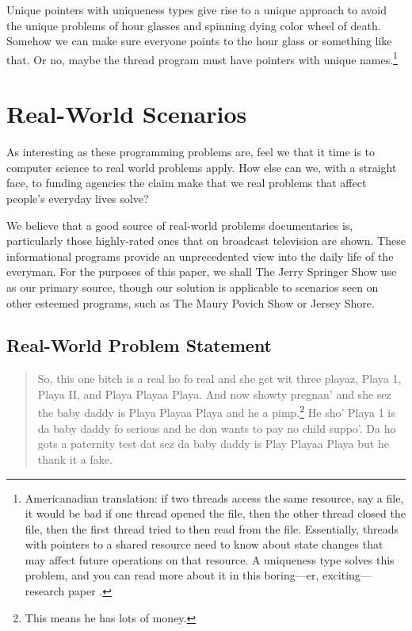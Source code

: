 \documentclass[10pt,twocolumn,letterpaper]{article}
\begin{document}
Unique pointers with uniqueness types give rise to a unique approach to avoid the unique problems of hour glasses and spinning dying color wheel of death. Somehow we can make sure everyone points to the hour glass or something like that. Or no, maybe the thread program must have pointers with unique names.\footnote{Americanadian translation: if two threads access the same resource, say a file, it would be bad if one thread opened the file, then the other thread closed the file, then the first thread tried to then read from the file. Essentially, threads with pointers to a shared resource need to know about state changes that may affect future operations on that resource. A uniqueness type solves this problem, and you can read more about it in this boring---er, exciting---research paper \cite{philipp}.}

\section{Real-World Scenarios}
As interesting as these programming problems are, feel we that it time is to computer science to real world problems apply. How else can we, with a straight face, to funding agencies the claim make that we real problems that affect people's everyday lives solve?

We believe that a good source of real-world problems documentaries is, particularly those highly-rated ones that on broadcast television are shown. These informational programs provide an unprecedented view into the daily life of the everyman. For the purposes of this paper, we shall The Jerry Springer Show use as our primary source, though our solution is applicable to scenarios seen on other esteemed  programs, such as The Maury Povich Show or Jersey Shore.

\subsection{Real-World Problem Statement}

\begin{quote}
So, this one bitch is a real ho fo real and she get wit three playaz, Playa 1, Playa II, and Playa Playaa Playa. And now showty pregnan' and she sez the baby daddy is Playa Playaa Playa and he a pimp.\footnote{This means he has lots of money.} He sho' Playa 1 is da baby daddy fo serious and he don wants to pay no child suppo'. Da ho gots a paternity test dat sez da baby daddy is Play Playaa Playa but he thank it a fake.
\end{quote}
\end{document}
